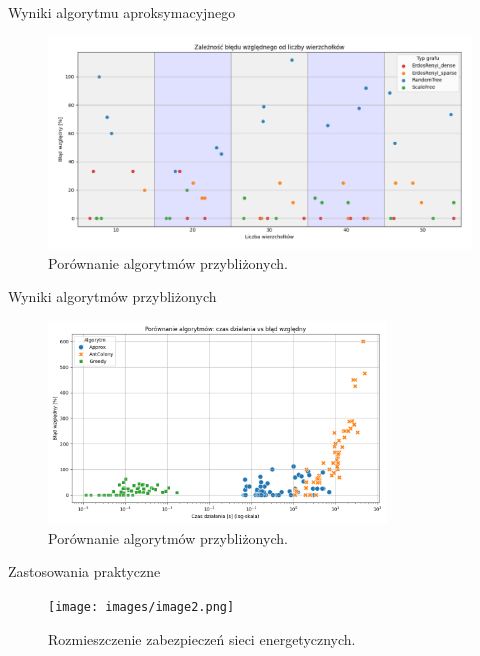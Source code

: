 \documentclass[polish,aspectratio=169]{beamer}
\begin{document}
\begin{frame}{Wyniki algorytmu aproksymacyjnego}
    \begin{figure}
        \centering
        \includegraphics[width=1\textwidth]{images/image.png}
        \caption{Porównanie algorytmów przybliżonych.}
    \end{figure}    
\end{frame}

\begin{frame}{Wyniki algorytmów przybliżonych}
    \begin{figure}
        \centering
        \includegraphics[width=0.8\textwidth]{images/alorithms.png}
        \caption{Porównanie algorytmów przybliżonych.}
    \end{figure}    
\end{frame}

\begin{frame}{Zastosowania praktyczne}
    \begin{figure}
        \centering
        \texttt{[image: images/image2.png]}
        \caption{Rozmieszczenie zabezpieczeń sieci energetycznych.}
    \end{figure}    
\end{frame}
\end{document}

